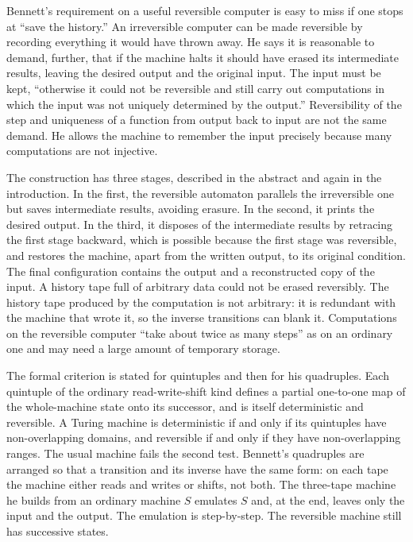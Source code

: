 \documentclass[12pt]{article}
\begin{document}
Bennett's requirement on a useful reversible computer is easy to miss if one stops at ``save the history.'' An irreversible computer can be made reversible by recording everything it would have thrown away. He says it is reasonable to demand, further, that if the machine halts it should have erased its intermediate results, leaving the desired output and the original input. The input must be kept, ``otherwise it could not be reversible and still carry out computations in which the input was not uniquely determined by the output.'' Reversibility of the step and uniqueness of a function from output back to input are not the same demand. He allows the machine to remember the input precisely because many computations are not injective.

The construction has three stages, described in the abstract and again in the introduction. In the first, the reversible automaton parallels the irreversible one but saves intermediate results, avoiding erasure. In the second, it prints the desired output. In the third, it disposes of the intermediate results by retracing the first stage backward, which is possible because the first stage was reversible, and restores the machine, apart from the written output, to its original condition. The final configuration contains the output and a reconstructed copy of the input. A history tape full of arbitrary data could not be erased reversibly. The history tape produced by the computation is not arbitrary: it is redundant with the machine that wrote it, so the inverse transitions can blank it. Computations on the reversible computer ``take about twice as many steps'' as on an ordinary one and may need a large amount of temporary storage.

The formal criterion is stated for quintuples and then for his quadruples. Each quintuple of the ordinary read-write-shift kind defines a partial one-to-one map of the whole-machine state onto its successor, and is itself deterministic and reversible. A Turing machine is deterministic if and only if its quintuples have non-overlapping domains, and reversible if and only if they have non-overlapping ranges. The usual machine fails the second test. Bennett's quadruples are arranged so that a transition and its inverse have the same form: on each tape the machine either reads and writes or shifts, not both. The three-tape machine he builds from an ordinary machine $S$ emulates $S$ and, at the end, leaves only the input and the output. The emulation is step-by-step. The reversible machine still has successive states.
\end{document}
